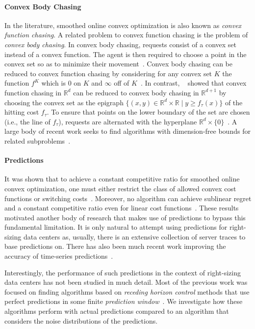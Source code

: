 \paragraph{Convex Body Chasing} In the literature, smoothed online convex optimization is also known as \emph{convex function chasing}. A related problem to convex function chasing is the problem of \emph{convex body chasing}. In convex body chasing, requests consist of a convex set instead of a convex function. The agent is then required to choose a point in the convex set so as to minimize their movement~\cite{Antoniadis2016}. Convex body chasing can be reduced to convex function chasing by considering for any convex set $K$ the function $f^K$ which is 0 on $K$ and $\infty$ off of $K$~\cite{Sellke2019}. In contrast,  \citeauthor*{Sellke2019}~\cite{Sellke2019} showed that convex function chasing in $\mathbb{R}^d$ can be reduced to convex body chasing in $\mathbb{R}^{d+1}$ by choosing the convex set as the epigraph $\{(x,y) \in \mathbb{R}^d \times \mathbb{R} \mid y \geq f_{\tau}(x)\}$ of the hitting cost $f_{\tau}$. To ensure that points on the lower boundary of the set are chosen (i.e., the line of $f_{\tau}$), requests are alternated with the hyperplane $\mathbb{R}^d \times \{0\}$~\cite{Sellke2019}. A large body of recent work seeks to find algorithms with dimension-free bounds for related subproblems~\cite{Bansal2017, Bubeck2018, Bubeck2018_2, Argue2019, Argue2020, Bubeck2020}.

\paragraph{Predictions} It was shown that to achieve a constant competitive ratio for smoothed online convex optimization, one must either restrict the class of allowed convex cost functions or switching costs~\cite{Chen2018}. Moreover, no algorithm can achieve sublinear regret and a constant competitive ratio even for linear cost functions~\cite{Andrew2015}. These results motivated another body of research that makes use of predictions to bypass this fundamental limitation. It is only natural to attempt using predictions for right-sizing data centers as, usually, there is an extensive collection of server traces to base predictions on. There has also been much recent work improving the accuracy of time-series predictions~\cite{Taylor2017, Benidis2020, Chen2020, Hosseini2021}.

Interestingly, the performance of such predictions in the context of right-sizing data centers has not been studied in much detail. Most of the previous work was focused on finding algorithms based on \emph{receding horizon control} methods that use perfect predictions in some finite \emph{prediction window}~\cite{Lin2012, Chen2015, Badiei2015, Chen2016, Li2018, Lin2019}. We investigate how these algorithms perform with actual predictions compared to an algorithm that considers the noise distributions of the predictions.

